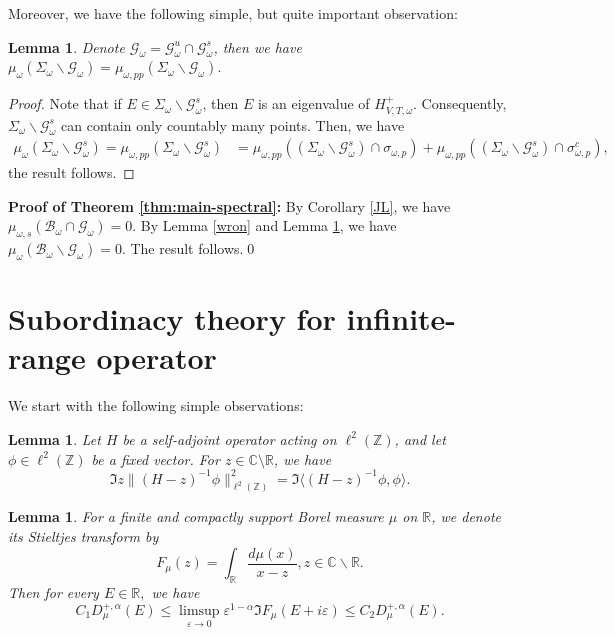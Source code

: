 \documentclass[11pt]{amsart}
\newtheorem{lemma}[theorem]{Lemma}
\theoremstyle{remark}
\theoremstyle{definition}
\newcommand{\C}{{\mathbf C}}
\newcommand{\R}{{\mathbf R}}
\newcommand{\Z}{{\mathbf Z}}
\def \C{{\mathcal{C}}}
\def \Z{\mathcal{Z}}
\def\Z{{\mathbb Z}}
\def\C{{\mathbb C}}
\def\R{{\mathbb R}}
\begin{document}
Moreover,
we have the following simple, but quite important observation:
\begin{lemma}\label{eig}
Denote $\mathcal{G}_{\omega}=\mathcal{G}_{\omega}^u\cap\mathcal{G}_{\omega}^s$, then  
 we have 
$\mu_\omega(\Sigma_{\omega} \backslash \mathcal{G}_{\omega}) = \mu_{\omega,pp}(\Sigma_{\omega}  \backslash \mathcal{G}_{\omega}).$ 
\end{lemma}
\begin{proof}
Note that if $E \in \Sigma_{\omega} \backslash \mathcal{G}_\omega^s$, then $E$ is an eigenvalue of $H^+_{V,T,\omega}$. Consequently, $\Sigma_{\omega} \backslash \mathcal{G}_\omega^s$ can contain only countably many points.  Then, we have
$$
\begin{aligned}
\mu_\omega(\Sigma_{\omega} \backslash \mathcal{G}_\omega^s) = \mu_{\omega,pp}(\Sigma_{\omega} \backslash \mathcal{G}_\omega^s) 
&= \mu_{\omega,pp}((\Sigma_{\omega} \backslash \mathcal{G}_\omega^s) \cap \sigma_{\omega,p}) + \mu_{\omega,pp}((\Sigma_{\omega} \backslash \mathcal{G}_\omega^s) \cap \sigma_{\omega,p}^c),
\end{aligned}
$$
the result follows. 
\end{proof}







  \textbf{Proof of Theorem \ref{thm:main-spectral}:}\label{proof1}
By Corollary \ref{JL}, we have $\mu_{\omega,s}(\mathcal{B}_{\omega}  \cap \mathcal{G}_{\omega})=0.$ By Lemma \ref{wron} and Lemma \ref{eig},  we have $\mu_{\omega}(\mathcal{B}_{\omega}\backslash \mathcal{G}_\omega)=0. $  The result follows.\qed



 	\section{Subordinacy theory for infinite-range operator}\label{proof of inf}
We start with the following simple observations:

\begin{lemma}\label{op-s}\cite{KL1}
Let \( H \) be a self-adjoint operator acting on \( \ell^2(\mathbb{Z}) \), and let \( \phi \in \ell^2(\mathbb{Z}) \) be a fixed vector. For \( z \in \mathbb{C} \setminus \mathbb{R} \), we have
 $$\Im z \|(H-z)^{-1}\phi\|^2_{\ell^{2}(\Z)}=\Im \langle (H-z)^{-1}\phi,\phi \rangle.$$
\end{lemma}



    \begin{lemma}\label{der}\cite{DF}
    For a finite and compactly support Borel measure $\mu$ on $\R$,
we denote its Stieltjes transform by 
$$F_\mu(z)=\int_\R \frac{d\mu(x)}{x-z},z\in\C\backslash\R.$$
    Then for every $E\in\R,$ we have 
        $$ C_1 D_\mu^{+,\alpha}(E)\leq\limsup_{\varepsilon\rightarrow0}\varepsilon^{1-\alpha}\Im F_\mu(E+i\varepsilon)\leq C_2 D_\mu^{+,\alpha}(E).$$
    \end{lemma}
\end{document}
